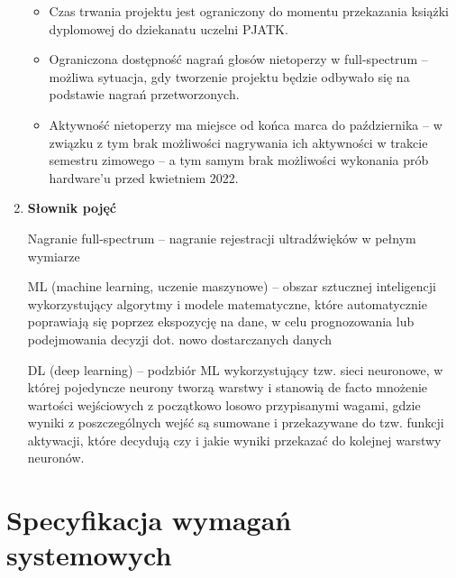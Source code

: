 \documentclass{sprz}
\begin{document}
\begin{enumerate}[label=\textbf{\arabic*}.]
    \begin{itemize}
      \item Czas trwania projektu jest ograniczony do momentu przekazania książki dyplomowej do dziekanatu uczelni PJATK.
      \item Ograniczona dostępność nagrań głosów nietoperzy w full-spectrum – możliwa sytuacja, gdy tworzenie projektu będzie odbywało się na podstawie nagrań przetworzonych.
      \item Aktywność nietoperzy ma miejsce od końca marca do października – w związku z tym brak możliwości nagrywania ich aktywności w trakcie semestru zimowego – a tym samym brak możliwości wykonania prób hardware’u przed kwietniem 2022.
    \end{itemize}

  \item \textbf{Słownik pojęć}
  
    Nagranie full-spectrum – nagranie rejestracji ultradźwięków w pełnym wymiarze

    ML (machine learning, uczenie maszynowe) – obszar sztucznej inteligencji wykorzystujący algorytmy i modele matematyczne, które automatycznie poprawiają się poprzez ekspozycję na dane, w celu prognozowania lub podejmowania decyzji dot. nowo dostarczanych danych

    DL (deep learning) – podzbiór ML wykorzystujący tzw. sieci neuronowe, w której pojedyncze neurony tworzą warstwy i stanowią de facto mnożenie wartości wejściowych z początkowo losowo przypisanymi wagami, gdzie wyniki z poszczególnych wejść są sumowane i przekazywane do tzw. funkcji aktywacji, które decydują czy i jakie wyniki przekazać do kolejnej warstwy neuronów.

\end{enumerate}

\section{Specyfikacja wymagań systemowych}
\end{document}

